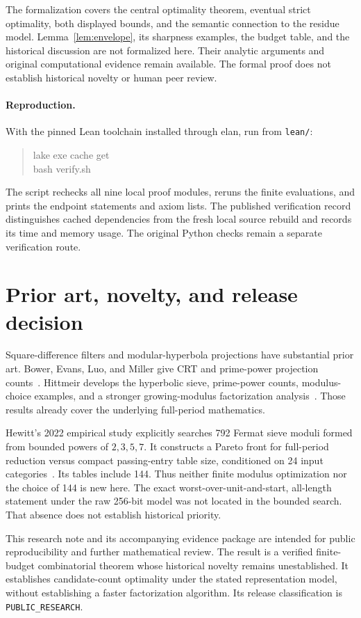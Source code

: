 \documentclass[11pt]{article}
\begin{document}
The formalization covers the central optimality theorem, eventual strict
optimality, both displayed bounds, and the semantic connection to the
residue model. Lemma~\ref{lem:envelope}, its sharpness examples, the budget
table, and the historical discussion are not formalized here. Their
analytic arguments and original computational evidence remain available.
The formal proof does not establish historical novelty or human peer
review.

\paragraph{Reproduction.}
With the pinned Lean toolchain installed through elan, run from
\texttt{lean/}:
\begin{quote}\small\ttfamily
lake exe cache get\\
bash verify.sh
\end{quote}
The script rechecks all nine local proof modules, reruns the finite
evaluations, and prints the endpoint statements and axiom lists. The
published verification record distinguishes cached dependencies from the
fresh local source rebuild and records its time and memory usage.
The original Python checks remain a separate verification route.

\section{Prior art, novelty, and release decision}

Square-difference filters and modular-hyperbola projections have substantial
prior art. Bower, Evans, Luo, and Miller give CRT and prime-power
projection counts~\cite{bower}. Hittmeir develops the hyperbolic sieve,
prime-power counts, modulus-choice examples, and a stronger growing-modulus
factorization analysis~\cite{hittmeir}. Those results already cover the
underlying full-period mathematics.

Hewitt's 2022 empirical study explicitly searches 792 Fermat sieve moduli
formed from bounded powers of $2,3,5,7$. It constructs a Pareto front for
full-period reduction versus compact passing-entry table size, conditioned
on 24 input categories~\cite{hewitt}.
Its tables include 144. Thus neither finite modulus optimization nor the
choice of 144 is new here. The exact worst-over-unit-and-start,
all-length statement under the raw 256-bit model was not located in the
bounded search. That absence does not establish historical priority.

This research note and its accompanying evidence package are intended for
public reproducibility and further mathematical review. The result is a
verified finite-budget combinatorial theorem whose historical novelty
remains unestablished. It establishes candidate-count optimality under the
stated representation model, without establishing a faster factorization
algorithm. Its release classification is \texttt{PUBLIC\_RESEARCH}.
\end{document}

